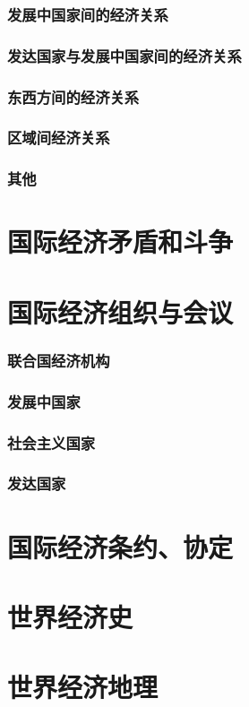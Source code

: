 \documentclass[UTF8]{../../RepresentationUniverse}
\begin{document}
        \subsubsection{发展中国家间的经济关系}
        \subsubsection{发达国家与发展中国家间的经济关系}
        \subsubsection{东西方间的经济关系}
        \subsubsection{区域间经济关系}
        \subsubsection{其他}
\section{国际经济矛盾和斗争}
\section{国际经济组织与会议}
    \subsubsection{联合国经济机构}
    \subsubsection{发展中国家}
    \subsubsection{社会主义国家}
    \subsubsection{发达国家}
\section{国际经济条约、协定}
\section{世界经济史}
\section{世界经济地理}
\end{document}
